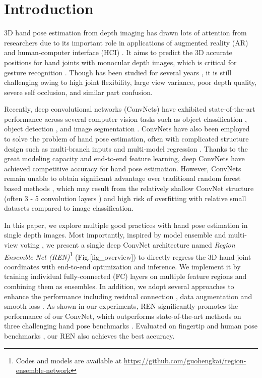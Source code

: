 \documentclass[10pt,twocolumn,letterpaper]{article}
\begin{document}
\section{Introduction}
3D hand pose estimation from depth imaging has drawn lots of attention from researchers \cite{sinha2016deephand} \cite{ye2016spatial} \cite{wan2016hand} due to its important role in applications of augmented reality (AR) and human-computer interface (HCI) \cite{zhou2016novel}. It aims to predict the 3D accurate positions for hand joints \cite{supancic2015depth} with monocular depth images, which is critical for gesture recognition \cite{chen2016static}. Though has been studied for several years \cite{supancic2015depth}, it is still challenging owing to high joint flexibility, large view variance, poor depth quality, severe self occlusion, and similar part confusion.

Recently, deep convolutional networks (ConvNets) have exhibited state-of-the-art performance across several computer vision tasks such as object classification \cite{krizhevsky2012imagenet}, object detection \cite{girshick2016region}, and image segmentation \cite{chen2016deeplab}. ConvNets have also been employed to solve the problem of hand pose estimation, often with complicated structure design such as multi-branch inputs \cite{tompson2014real}\cite{oberweger2015hands} and multi-model regression \cite{oberweger2015hands} \cite{oberwegertraining} \cite{gerobust} \cite{zhang2016learning}. Thanks to the great modeling capacity and end-to-end feature learning, deep ConvNets have achieved competitive accuracy for hand pose estimation. However, ConvNets remain unable to obtain significant advantage over traditional random forest based methods \cite{sun2015cascaded} \cite{wan2016hand}, which may result from the relatively shallow ConvNet structure (often 3 - 5 convolution layers \cite{tompson2014real} \cite{oberwegertraining} \cite{zhang2016learning}) and high risk of overfitting with relative small datasets compared to image classification.

In this paper, we explore multiple good practices with hand pose estimation in single depth images. Most importantly, inspired by model ensemble and multi-view voting \cite{krizhevsky2012imagenet}, we present a single deep ConvNet architecture named \emph{Region Ensemble Net (REN)}\footnote{Codes and models are available at \url{https://github.com/guohengkai/region-ensemble-network}} (Fig.\ref{fig_overview}) to directly regress the 3D hand joint coordinates with end-to-end optimization and inference. We implement it by training individual fully-connected (FC) layers on multiple feature regions and combining them as ensembles. In addition, we adopt several approaches to enhance the performance including residual connection \cite{he2015deep}, data augmentation and smooth  loss \cite{girshick2015fast}. As shown in our experiments, REN significantly promotes the performance of our ConvNet, which outperforms state-of-the-art methods on three challenging hand pose benchmarks \cite{tompson2014real} \cite{tang2014latent} \cite{sun2015cascaded}. Evaluated on fingertip \cite{tompson2014real} and human pose benchmarks \cite{haque2016towards}, our REN also achieves the best accuracy.
\end{document}
